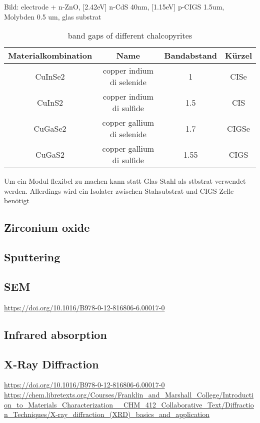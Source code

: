 {Bild: electrode + n-ZnO, [2.42eV] n-CdS 40nm, [1.15eV] p-CIGS 1.5um, Molybden 0.5 um, glas substrat} 
\begin{table}[htb]
    \begin{tabular}{cccc}
        \hline\hline
        Materialkombination&    Name&   Bandabstand&    Kürzel\\
        \hline
        CuInSe2&        copper indium di selenide&  1&  CISe\\
        CuInS2&        copper indium di sulfide&  1.5&  CIS\\
        CuGaSe2&        copper gallium di selenide&  1.7&  CIGSe\\
        CuGaS2&        copper gallium di sulfide&  1.55&  CIGS\\
        \hline\hline
    \end{tabular}
	\caption{band gaps of different chalcopyrites}
	\label{tab:cigs}
\end{table}


Um ein Modul flexibel zu machen kann statt Glas Stahl als stbstrat verwendet werden. 
Allerdings wird ein Isolater zwischen Stahsubstrat und CIGS Zelle benötigt


\subsection{Zirconium oxide}
\subsection{Sputtering}
\subsection{SEM}
\url{https://doi.org/10.1016/B978-0-12-816806-6.00017-0}\\
\subsection{Infrared absorption}
\subsection{X-Ray Diffraction}
\url{https://doi.org/10.1016/B978-0-12-816806-6.00017-0}\\
\url{https://chem.libretexts.org/Courses/Franklin_and_Marshall_College/Introduction_to_Materials_Characterization__CHM_412_Collaborative_Text/Diffraction_Techniques/X-ray_diffraction_(XRD)_basics_and_application}\\

